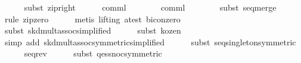 \begin{isabellebody}
\ \ \ \ \isamarkupfalse%
\ {}subst\ zip{}right{}\isanewline
\ \ \ \ \isamarkupfalse%
\ {}comml{}\ {}\ {}{}\isanewline
\ \ \ \ \isamarkupfalse%
\ {}comml{}\ {}\ {}{}\isanewline
\ \ \ \ \isamarkupfalse%
\ {}subst\ seq{}merge{}\isanewline
\ \ \ \ \isamarkupfalse%
\ {}rule\ zip{}zero{}\isanewline
\ \ \ \ \isamarkupfalse%
\ {}metis\ {}lifting{}\ a{}test\ bicon{}zero{}\isanewline
\ \ \ \ \isamarkupfalse%
\ {}subst\ skd{}mult{}assoc{}simplified{}{}\isanewline
\ \ \ \ \isamarkupfalse%
\ {}subst\ kozen{}{}\isanewline
\ \ \ \ \isamarkupfalse%
\ {}simp\ add{}\ skd{}mult{}assoc{}symmetric{}simplified{}{}\isanewline
\ \ \ \ \isamarkupfalse%
\ {}subst\ seq{}singleton{}symmetric{}{}\isanewline
\ \ \ \ \isamarkupfalse%
\ seq{}rev\isanewline
\ \ \ \ \isamarkupfalse%
\ {}subst\ qes{}snoc{}symmetric{}{}{}\isanewline

\end{isabellebody}
